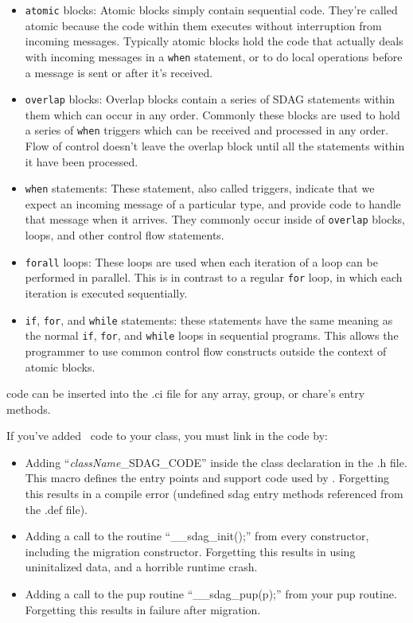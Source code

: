 \begin{itemize}
    \item {\tt atomic} blocks: Atomic blocks simply contain sequential \CC code.
        They're called atomic because the code within them executes without
        interruption from incoming messages. Typically atomic blocks hold the
        code that actually deals with incoming messages in a {\tt when}
        statement, or to do local operations before a message is sent or after
        it's received.
    \item {\tt overlap} blocks: Overlap blocks contain a series of SDAG
        statements within them which can occur in any order. Commonly these
        blocks are used to hold a series of {\tt when} triggers which can be
        received and processed in any order. Flow of control doesn't leave the
        overlap block until all the statements within it have been processed.
    \item {\tt when} statements: These statement, also called triggers, indicate
        that we expect an incoming message of a particular type, and provide
        code to handle that message when it arrives. They commonly occur inside
        of {\tt overlap} blocks, loops, and other control flow statements.
    \item {\tt forall} loops: These loops are used when each iteration of a loop
        can be performed in parallel. This is in contrast to a regular {\tt for}
        loop, in which each iteration is executed sequentially.
    \item {\tt if}, {\tt for}, and {\tt while} statements: these statements have
        the same meaning as the normal {\tt if}, {\tt for}, and {\tt while}
        loops in sequential \CC programs. This allows the programmer to use
        common control flow constructs outside the context of atomic blocks.
\end{itemize}

\sdag{} code can be inserted into the .ci file for any array, group, or chare's entry methods.

If you've added \sdag\ code to your class, you must link in the code by:
\begin{itemize}
  \item Adding ``{\it className}\_SDAG\_CODE'' inside the class declaration
     in the .h file.  This macro defines the entry points and support
     code used by \sdag{}.  Forgetting this results in a compile error
     (undefined sdag entry methods referenced from the .def file).
  \item Adding a call to the routine ``\_\_sdag\_init();'' from every constructor,
     including the migration constructor.  Forgetting this results in
     using uninitalized data, and a horrible runtime crash.
  \item Adding a call to the pup routine ``\_\_sdag\_pup(p);'' from your pup routine.
     Forgetting this results in failure after migration.
\end{itemize}

